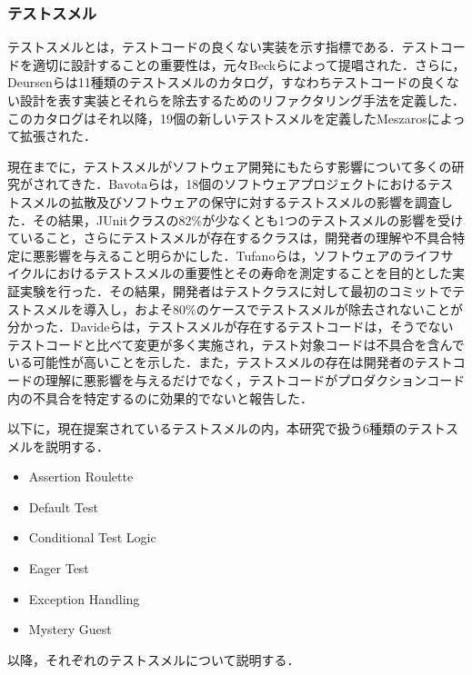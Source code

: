 \documentclass[12pt]{jarticle} %
\begin{document}
\subsubsection{テストスメル}
\label{sec:backtestsmell}



テストスメルとは，テストコードの良くない実装を示す指標である．テストコードを適切に設計することの重要性は，元々Beckら\cite{h1}によって提唱された．さらに，Deursenら\cite{t1}は11種類のテストスメルのカタログ，すなわちテストコードの良くない設計を表す実装とそれらを除去するためのリファクタリング手法を定義した．このカタログはそれ以降，19個の新しいテストスメルを定義したMeszaros\cite{b6}によって拡張された．

現在までに，テストスメルがソフトウェア開発にもたらす影響について多くの研究がされてきた．Bavotaら\cite{Bavota}は，18個のソフトウェアプロジェクトにおけるテストスメルの拡散及びソフトウェアの保守に対するテストスメルの影響を調査した．その結果，JUnitクラスの82\%が少なくとも1つのテストスメルの影響を受けていること，さらにテストスメルが存在するクラスは，開発者の理解や不具合特定に悪影響を与えること明らかにした．Tufanoら\cite{Tufano}は，ソフトウェアのライフサイクルにおけるテストスメルの重要性とその寿命を測定することを目的とした実証実験を行った．その結果，開発者はテストクラスに対して最初のコミットでテストスメルを導入し，およそ80\%のケースでテストスメルが除去されないことが分かった．Davideら\cite{Davide}は，テストスメルが存在するテストコードは，そうでないテストコードと比べて変更が多く実施され，テスト対象コードは不具合を含んでいる可能性が高いことを示した．また，テストスメルの存在は開発者のテストコードの理解に悪影響を与えるだけでなく，テストコードがプロダクションコード内の不具合を特定するのに効果的でないと報告した．

以下に，現在提案されているテストスメルの内，本研究で扱う6種類のテストスメルを説明する．

\begin{itemize}
\item Assertion Roulette
\item Default Test
\item Conditional Test Logic
\item Eager Test
\item Exception Handling
\item Mystery Guest
\end{itemize}

以降，それぞれのテストスメルについて説明する．
\end{document}
